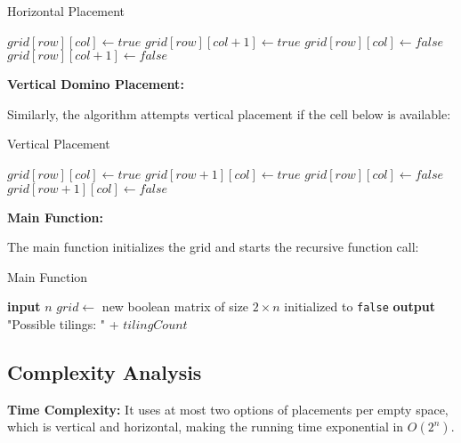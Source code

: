 \documentclass[conference]{IEEEtran}
\begin{document}
\begin{algorithm}[htbp]
\caption{Horizontal Placement}
\begin{algorithmic}[1]
    \State $grid[row][col] \gets true$
    \State $grid[row][col + 1] \gets true$
    \State {}
    \State $grid[row][col] \gets false$ 
    \State $grid[row][col + 1] \gets false$
\EndIf
\end{algorithmic}
\end{algorithm}

\textbf{Vertical Domino Placement:}

Similarly, the algorithm attempts vertical placement if the cell below is available:

\begin{algorithm}[htbp]
\caption{Vertical Placement}
\begin{algorithmic}[1]
    \State $grid[row][col] \gets true$
    \State $grid[row + 1][col] \gets true$
    \State {}
    \State $grid[row][col] \gets false$ 
    \State $grid[row + 1][col] \gets false$
\EndIf
\end{algorithmic}
\end{algorithm}

\textbf{Main Function:}

The main function initializes the grid and starts the recursive function call:

\begin{algorithm}[htbp]
\caption{Main Function}
\begin{algorithmic}[1]
    \State \textbf{input} $n$ 
    \State $grid \gets$ new boolean matrix of size $2 \times n$ initialized to \texttt{false}
    \State {}
    \State \textbf{output} "Possible tilings: " + $tilingCount$
\EndProcedure
\end{algorithmic}
\end{algorithm}

\subsection{Complexity Analysis}

\textbf{Time Complexity:} It uses at most two options of placements per empty space, which is vertical and horizontal, making the running time exponential in $O(2^n)$.
\end{document}
